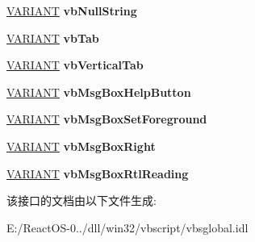\begin{DoxyCompactItemize}
\hyperlink{structtag_v_a_r_i_a_n_t}{V\+A\+R\+I\+A\+NT} {\bfseries vb\+Null\+String}
\item 
\mbox{\label{interface_v_b_script___global_1_1_global_obj_a1e8bd95ceca5e6994b4fc8ee04e47fef}} 
\hyperlink{structtag_v_a_r_i_a_n_t}{V\+A\+R\+I\+A\+NT} {\bfseries vb\+Tab}
\item 
\mbox{\label{interface_v_b_script___global_1_1_global_obj_a2277f962fab481cbf045a1b85c01c4b3}} 
\hyperlink{structtag_v_a_r_i_a_n_t}{V\+A\+R\+I\+A\+NT} {\bfseries vb\+Vertical\+Tab}
\item 
\mbox{\label{interface_v_b_script___global_1_1_global_obj_a4cefec82a4d5349cf736eabd78c904c6}} 
\hyperlink{structtag_v_a_r_i_a_n_t}{V\+A\+R\+I\+A\+NT} {\bfseries vb\+Msg\+Box\+Help\+Button}
\item 
\mbox{\label{interface_v_b_script___global_1_1_global_obj_aa47e9d2932d55ce8cbb6f26486020bb2}} 
\hyperlink{structtag_v_a_r_i_a_n_t}{V\+A\+R\+I\+A\+NT} {\bfseries vb\+Msg\+Box\+Set\+Foreground}
\item 
\mbox{\label{interface_v_b_script___global_1_1_global_obj_a42fcc485a610269b0d583786b407b8ec}} 
\hyperlink{structtag_v_a_r_i_a_n_t}{V\+A\+R\+I\+A\+NT} {\bfseries vb\+Msg\+Box\+Right}
\item 
\mbox{\label{interface_v_b_script___global_1_1_global_obj_a61c9b3ee6f6c851a4c7a855ad47aabc0}} 
\hyperlink{structtag_v_a_r_i_a_n_t}{V\+A\+R\+I\+A\+NT} {\bfseries vb\+Msg\+Box\+Rtl\+Reading}
\end{DoxyCompactItemize}


该接口的文档由以下文件生成\+:\begin{DoxyCompactItemize}
\item 
E\+:/\+React\+O\+S-\/0../dll/win32/vbscript/vbsglobal.\+idl\end{DoxyCompactItemize}
